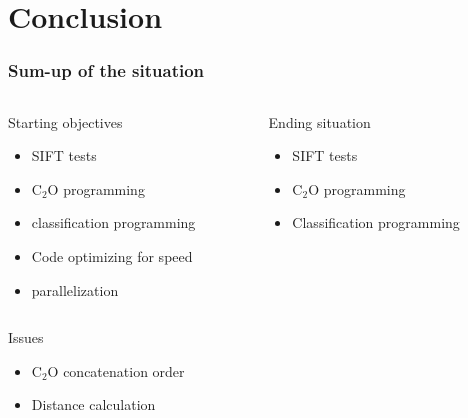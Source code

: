 \documentclass[xcolor=table]{beamer}
\begin{document}
\section{Conclusion}

\begin{frame} \frametitle{Sum-up of the situation}

\begin{columns}[t]
  \begin{column}{5cm}
  \begin{block}{Starting objectives}
	\begin{itemize}
		\item SIFT tests
		\item C$_2$O programming
		\item classification programming
		\item Code optimizing for speed
		\item parallelization
	\end{itemize}
  \end{block}
  \end{column}

  \begin{column}{5cm}
  \begin{block}{Ending situation}
  \begin{itemize}
		\item SIFT tests
		\item C$_2$O programming
		\item Classification programming
  \end{itemize}
  \end{block}
  \end{column}
 \end{columns}

\begin{alertblock}{Issues}
	\begin{itemize}
		\item C$_2$O concatenation order
		\item Distance calculation
	\end{itemize}	
\end{alertblock}
\end{frame}
\end{document}
